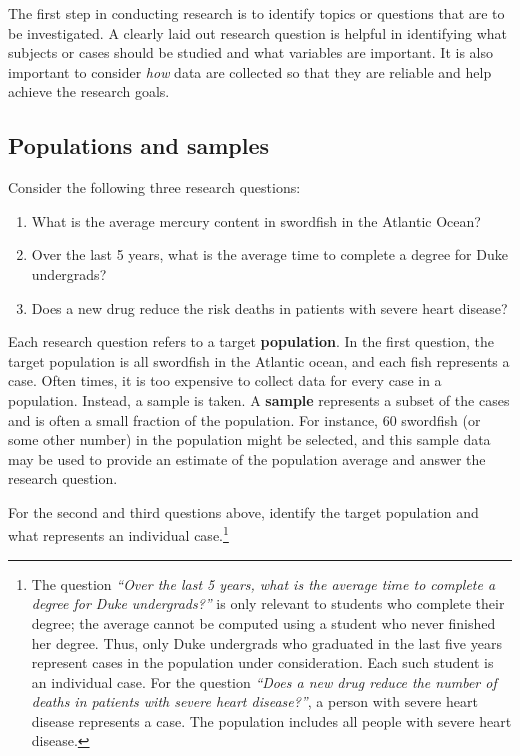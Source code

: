 \documentclass[
  10pt,
  openany]{book}
\providecommand{\tightlist}{%
  \setlength{\itemsep}{0pt}\setlength{\parskip}{0pt}}
\theoremstyle{definition}
\theoremstyle{definition}
\theoremstyle{definition}
\theoremstyle{definition}
\theoremstyle{remark}
\begin{document}

The first step in conducting research is to identify topics or questions that are to be investigated.
A clearly laid out research question is helpful in identifying what subjects or cases should be studied and what variables are important.
It is also important to consider \emph{how} data are collected so that they are reliable and help achieve the research goals.

\subsection{Populations and samples}\label{populations-and-samples}

Consider the following three research questions:

\begin{enumerate}
\def\labelenumi{\arabic{enumi}.}
\tightlist
\item
  What is the average mercury content in swordfish in the Atlantic Ocean?
\item
  Over the last 5 years, what is the average time to complete a degree for Duke undergrads?
\item
  Does a new drug reduce the risk deaths in patients with severe heart disease?
\end{enumerate}

Each research question refers to a target \textbf{population}.
In the first question, the target population is all swordfish in the Atlantic ocean, and each fish represents a case.
Often times, it is too expensive to collect data for every case in a population.
Instead, a sample is taken.
A \textbf{sample} represents a subset of the cases and is often a small fraction of the population.
For instance, 60 swordfish (or some other number) in the population might be selected, and this sample data may be used to provide an estimate of the population average and answer the research question.

For the second and third questions above, identify the target population and what represents an individual case.\footnote{The question \emph{``Over the last 5 years, what is the average time to complete a degree for Duke undergrads?''} is only relevant to students who complete their degree; the average cannot be computed using a student who never finished her degree. Thus, only Duke undergrads who graduated in the last five years represent cases in the population under consideration. Each such student is an individual case. For the question \emph{``Does a new drug reduce the number of deaths in patients with severe heart disease?''}, a person with severe heart disease represents a case. The population includes all people with severe heart disease.}
\end{document}
